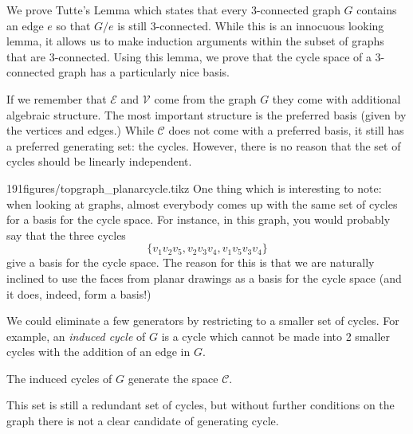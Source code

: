 
\begin{elevator}
We prove Tutte's Lemma which states that every 3-connected graph $G$ contains an edge $e$ so that $G/e$ is still 3-connected. While this is an innocuous looking lemma, it allows us to make induction arguments within the subset of graphs that are 3-connected. Using this lemma, we prove that the cycle space of a 3-connected graph has a particularly nice basis. 
\end{elevator}
\label{sec:graph:3connected}

If we remember that  $\mathcal E$ and $\mathcal V$ come from the graph  $G$ they come with additional algebraic structure. The most important structure is the preferred basis (given by the vertices and edges.) While $\mathcal C$ does not come with a preferred basis, it still has a preferred generating set: the cycles. However, there is no reason that the set of cycles should be linearly independent.
\begin{examplefigureenv}{191figures/topgraph_planarcycle.tikz}
	One thing which is interesting to note: when looking at graphs, almost everybody comes up with the same set of cycles for a basis for the cycle space. For instance, in this graph, you would probably say that the three cycles \[\{v_1v_2v_5,v_2v_3v_4, v_1v_5v_3v_4\}\] give a basis for the cycle space. The reason for this is that we are naturally inclined to use the faces from planar drawings as a basis for the cycle space (and it does, indeed, form a basis!) 
\end{examplefigureenv}

We could eliminate a few generators by restricting to a smaller set of cycles.  For example, an \emph{induced cycle} of $G$ is a cycle which cannot be made into 2 smaller cycles with the addition of an edge in $G$. 
\begin{claim}
 The induced cycles of $G$ generate the space $\mathcal C$. 
\end{claim}
This set is still a redundant set of cycles, but without further conditions on the graph there is not a clear candidate of generating cycle.

